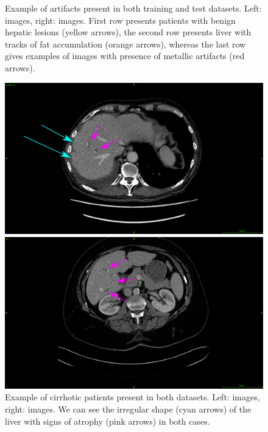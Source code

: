 \begin{figure}[!ht]
\begin{minipage}{0.45\linewidth}
	\end{minipage}
	\caption{Example of artifacts present in both training and test datasets. Left: \textbf{} images, right: \textbf{} images. First row presents patients with benign hepatic lesions (yellow arrows), the second row presents liver with tracks of fat accumulation (orange arrows), whereas the last row gives examples of images with presence of metallic artifacts (red arrows).}
	\label{fig:InterDb_artifacts}
\end{figure}
\begin{figure}[!ht]
	\centering
	\begin{minipage}{0.45\linewidth}
		\includegraphics[width=\linewidth]{../Contributions/images/ResizeLITS_cirrhoticPatientArrows}
	\end{minipage} \hspace{-0.1cm}
	\begin{minipage}{0.45\linewidth}
		\includegraphics[width=\linewidth]{../Contributions/images/ResizeTCIA_cirrhoticPatientArrows}
	\end{minipage}
	\caption{Example of cirrhotic patients present in both datasets.  Left: \textbf{} images, right: \textbf{} images. We can see the irregular shape (cyan arrows) of the liver with signs of atrophy (pink arrows) in both cases.}
	\label{fig:InterDb_diseasedLivers}
\end{figure}

